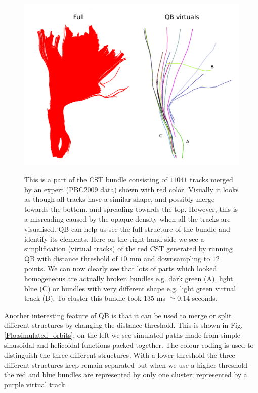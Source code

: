 \documentclass[preprint,authoryear,a4paper,10pt,onecolumn]{elsarticle}
\begin{document}
%
\begin{figure}
\begin{centering}
\label{Flo:cst_pbc}\includegraphics[scale=0.3]{last_figures/cst_simplification}
\par\end{centering}
\caption{This is a part of the CST bundle consisting of $11041$ tracks
  merged by an expert (PBC2009 data) shown with red color. Visually it
  looks as though all tracks have a similar shape, and possibly merge
  towards the bottom, and spreading towards the top. However, this is a
  misreading caused by the opaque density when all the tracks are
  visualised.  QB can help us see the full structure of the bundle and
  identify its elements. Here on the right hand side we see a
  simplification (virtual tracks) of the red CST generated by running QB
  with distance threshold of $10$ mm and downsampling to $12$ points. We
  can now clearly see that lots of parts which looked homogeneous are
  actually broken bundles e.g. dark green (A), light blue (C) or bundles
  with very different shape e.g. light green virtual track (B). To
  cluster this bundle took $135$ ms $\simeq$$0.14$ seconds.}

\end{figure}

Another interesting feature of QB is that it can be used to merge
or split different structures by changing the distance threshold.
This is shown in Fig. \ref{Flo:simulated_orbits}; on the left we
see simulated paths made from simple sinusoidal and helicoidal functions
packed together. The colour coding is used to distinguish the three
different structures. With a lower threshold the three different structures
keep remain separated but when we use a higher threshold the red and
blue bundles are represented by only one cluster; represented by a
purple virtual track.
\end{document}
